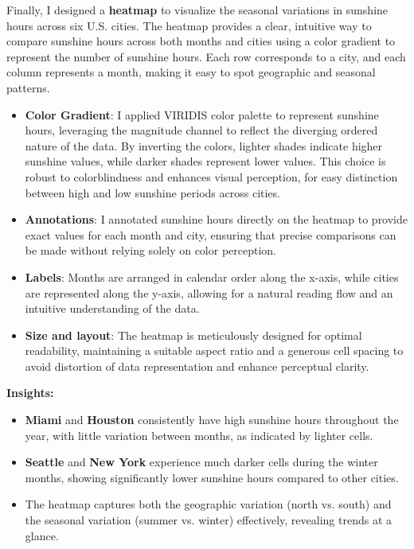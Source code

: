 \documentclass{article}
\begin{document}
Finally, I designed a \textbf{heatmap} to visualize the seasonal variations in sunshine hours across six U.S. cities. The heatmap provides a clear, intuitive way to compare sunshine hours across both months and cities using a color gradient to represent the number of sunshine hours. Each row corresponds to a city, and each column represents a month, making it easy to spot geographic and seasonal patterns.
                
\begin{itemize}
    \item \textbf{Color Gradient}: I applied VIRIDIS color palette to represent sunshine hours, leveraging the magnitude channel to reflect the diverging ordered nature of the data. By inverting the colors, lighter shades indicate higher sunshine values, while darker shades represent lower values.  This choice is robust to colorblindness and enhances visual perception, for easy distinction between high and low sunshine periods across cities.\cite{TheComprehensiveRArchiveNetwork}\cite{munzner2014visualization}
                    
    \item \textbf{Annotations}: I annotated sunshine hours directly on the heatmap to provide exact values for each month and city, ensuring that precise comparisons can be made without relying solely on color perception.
                    
    \item \textbf{Labels}: Months are arranged in calendar order along the x-axis, while cities are represented along the y-axis, allowing for a natural reading flow and an intuitive understanding of the data.

    \item \textbf{Size and layout}: The heatmap is meticulously designed for optimal readability, maintaining a suitable aspect ratio and a generous cell spacing to avoid distortion of data representation and enhance perceptual clarity.
\end{itemize}
                
\textbf{Insights:}
\begin{itemize}

    \item \textbf{Miami} and \textbf{Houston} consistently have high sunshine hours throughout the year, with little variation between months, as indicated by lighter cells.
                    
    \item \textbf{Seattle} and \textbf{New York} experience much darker cells during the winter months, showing significantly lower sunshine hours compared to other cities.

    \item The heatmap captures both the geographic variation (north vs. south) and the seasonal variation (summer vs. winter) effectively, revealing trends at a glance.
                    
\end{itemize}
\end{document}
